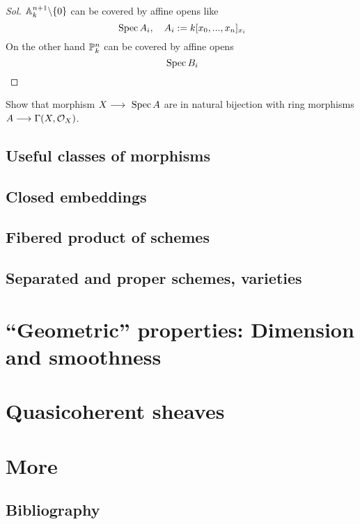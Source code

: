\documentclass[11pt]{book} %
\begin{document}
\begin{proof}[Sol]
$\mathbb A^{n+1}_k\backslash \{0\}$ can be covered by affine opens like
$$
\text{ Spec\,} A_i,\ \ \  A_i:= k[x_0,...,x_n]_{x_i}
$$
On the other hand $\mathbb P^{n}_{k}$ can be covered by affine opens
$$
\text{ Spec\,} B_i
$$
\end{proof}
\begin{exr}
Show that morphism $X\longrightarrow \text{ Spec\,} A$ are in natural bijection with ring morphisms $A\longrightarrow \Gamma(X,{\cal O}_X)$.
\end{exr}
\chapter{Useful classes of morphisms}
\chapter{Closed embeddings}
\chapter{Fibered product of schemes}
\chapter{Separated and proper schemes, varieties}
\part{``Geometric'' properties: Dimension and smoothness}

\part{Quasicoherent sheaves}

\part{More}


\chapter*{Bibliography}

\end{document}
